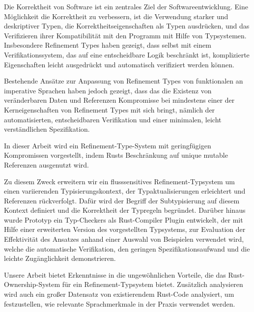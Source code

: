 
\Abstract
Die Korrektheit von Software ist ein zentrales Ziel der Softwareentwicklung.
Eine Möglichkeit die Korrektheit zu verbessern, ist die Verwendung starker und deskriptiver Typen, die Korrektheitseigenschaften als Typen ausdrücken, und das Verifizieren ihrer Kompatibilität mit den Programm mit Hilfe von Typsystemen.
Insbesondere Refinement Types haben gezeigt, dass selbst mit einem Verifikationssystem, das auf eine entscheidbare Logik beschränkt ist, komplizierte Eigenschaften leicht ausgedrückt und automatisch verifiziert werden können.

Bestehende Ansätze zur Anpassung von Refinement Types von funktionalen an imperative Sprachen haben jedoch gezeigt, dass das die Existenz von veränderbaren Daten und Referenzen Kompromisse bei mindestens einer der Kerneigenschaften von Refinement Types mit sich bringt, nämlich der automatisierten, entscheidbaren Verifikation und einer minimalen, leicht verständlichen Spezifikation.

In dieser Arbeit wird ein Refinement-Type-System mit geringfügigen Kompromissen vorgestellt, indem Rusts Beschränkung auf unique mutable Referenzen ausgenutzt wird.


Zu diesem Zweck erweitern wir ein flusssensitives Refinement-Typsystem um einen variierenden Typisierungskontext, der Typaktualisierungen erleichtert und Referenzen rückverfolgt. Dafür wird der Begriff der Subtypisierung auf diesem Kontext definiert und die Korrektheit der Typregeln begründet.
Darüber hinaus wurde Prototyp ein Typ-Checkers als Rust-Compiler Plugin entwickelt, der mit Hilfe einer erweiterten Version des vorgestellten Typsystems, zur Evaluation der Effektivität des Ansatzes anhand einer Auswahl von Beispielen verwendet wird, welche die automatische Verifikation, den geringen Spezifikationsaufwand und die leichte Zugänglichkeit demonstrieren.

Unsere Arbeit bietet Erkenntnisse in die ungewöhnlichen Vorteile, die das Rust-Ownership-System für ein Refinement-Typsystem bietet. Zusätzlich analysieren wird auch ein großer Datensatz von existierendem Rust-Code analysiert, um festzustellen, wie relevante Sprachmerkmale in der Praxis verwendet werden.
